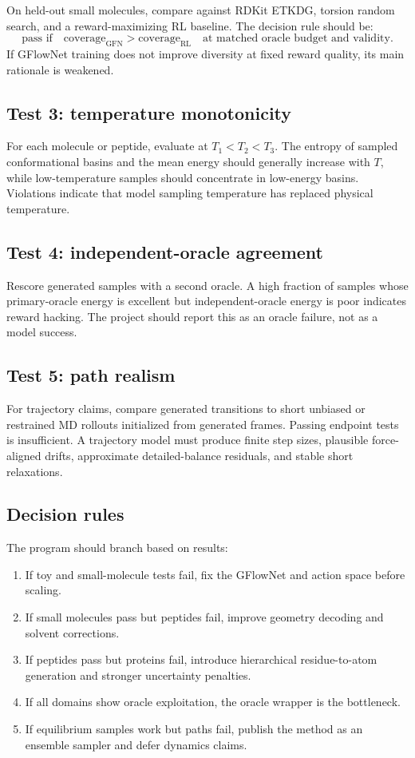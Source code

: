 \documentclass[11pt]{article}
\begin{document}
On held-out small molecules, compare against RDKit ETKDG, torsion random search, and a reward-maximizing RL baseline. The decision rule should be:
\[
\text{pass if}\quad
\mathrm{coverage}_{\mathrm{GFN}}>\mathrm{coverage}_{\mathrm{RL}}
\quad\text{at matched oracle budget and validity}.
\]
If GFlowNet training does not improve diversity at fixed reward quality, its main rationale is weakened.

\subsection{Test 3: temperature monotonicity}

For each molecule or peptide, evaluate at $T_1<T_2<T_3$. The entropy of sampled conformational basins and the mean energy should generally increase with $T$, while low-temperature samples should concentrate in low-energy basins. Violations indicate that model sampling temperature has replaced physical temperature.

\subsection{Test 4: independent-oracle agreement}

Rescore generated samples with a second oracle. A high fraction of samples whose primary-oracle energy is excellent but independent-oracle energy is poor indicates reward hacking. The project should report this as an oracle failure, not as a model success.

\subsection{Test 5: path realism}

For trajectory claims, compare generated transitions to short unbiased or restrained MD rollouts initialized from generated frames. Passing endpoint tests is insufficient. A trajectory model must produce finite step sizes, plausible force-aligned drifts, approximate detailed-balance residuals, and stable short relaxations.

\subsection{Decision rules}

The program should branch based on results:
\begin{enumerate}[leftmargin=2em]
  \item If toy and small-molecule tests fail, fix the GFlowNet and action space before scaling.
  \item If small molecules pass but peptides fail, improve geometry decoding and solvent corrections.
  \item If peptides pass but proteins fail, introduce hierarchical residue-to-atom generation and stronger uncertainty penalties.
  \item If all domains show oracle exploitation, the oracle wrapper is the bottleneck.
  \item If equilibrium samples work but paths fail, publish the method as an ensemble sampler and defer dynamics claims.
\end{enumerate}
\end{document}
